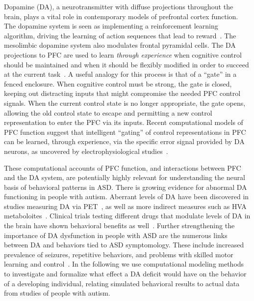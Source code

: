 Dopamine (DA), a neurotransmitter with diffuse projections throughout the brain, plays a vital role in contemporary models of prefrontal cortex function.  The dopamine system is seen as implementing a reinforcement learning algorithm, driving the learning of action sequences that lead to reward~\cite{MontaguePR:1996:Dopamine,BartoAG:1994:TDLearning}.  The mesolimbic dopamine system also modulates frontal pyramidal cells.  The DA projections to PFC are used to learn \emph{through experience} when cognitive control should be maintained and when it should be flexibly modified in order to succeed at the current task~\cite{BraverTS:2000:Control,RougierNP:2005:XT}. A useful analogy for this process is that of a “gate” in a fenced enclosure. When cognitive control must be strong, the gate is closed, keeping out distracting inputs that might compromise the needed PFC control signals. When the current control state is no longer appropriate, the gate opens, allowing the old control state to escape and permitting a new control representation to enter the PFC via its inputs.  Recent computational models of PFC function suggest that intelligent ``gating'' of control representations in PFC can be learned, through experience, via the specific error signal provided by DA neurons, as uncovered by electrophysiological studies~\cite{RougierNP:2005:XT,RougierNP:2002:TaskSwitching}. 

These computational accounts of PFC function, and interactions between PFC and the DA system, are potentially highly relevant for understanding the neural basis of behavioral patterns in ASD.  There is growing evidence for abnormal DA functioning in people with autism.  Aberrant levels of DA have been discovered in studies measuring DA via PET~\cite{FernellE:1997:AutismPET}, as well as more indirect measures such as HVA metaboloites~\cite{MartineauJ:1992:AutismDopamine}.  Clinical trials testing different drugs that modulate levels of DA in the brain have shown behavioral benefits as well~\cite{PoseyDJ:2000:AutismDopamine,TsaiLY:1999:AutismDopamine}. Further strengthening the importance of DA dysfunction in people with ASD are the numerous links between DA and behaviors tied to ASD symptomology.  These include increased prevalence of seizures, repetitive behaviors, and problems with skilled motor learning and control~\cite{RefWorks:1,RefWorks:3,RefWorks:5,RefWorks:2,RefWorks:109}.  In the following we use computational modeling methods to investigate and formalize what effect a DA deficit would have on the behavior of a developing individual, relating simulated behavioral results to actual data from studies of people with autism.  

